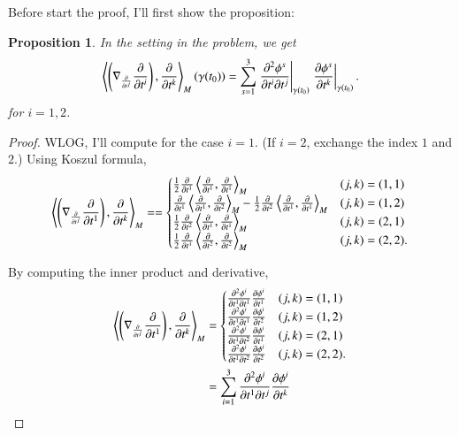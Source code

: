 \documentclass[a4paper, 12pt]{article}
\theoremstyle{Mydefinition}
\theoremstyle{Mytheorem}
\newtheorem{proposition}[statement]{Proposition}
\begin{document}
Before start the proof, I'll first show the proposition:
\begin{proposition}
In the setting in the problem, we get
\begin{equation*}
    \left\langle \left(\nabla_{\pdv{t^j}}\pdv{t^i}\right), \pdv{t^k}\right\rangle_M(\gamma(t_0))=\sum_{s=1}^3\left.\frac{\partial^2\phi^s}{\partial t^i\partial t^j}\right|_{\gamma(t_0)}\left.\frac{\partial\phi^s}{\partial t^k}\right|_{\gamma(t_0)}.
\end{equation*}
for $i=1,2$.
\end{proposition}
\begin{proof}
WLOG, I'll compute for the case $i=1$. (If $i=2$, exchange the index $1$ and $2$.) Using Koszul formula,
\begin{equation*}
    \left\langle \left(\nabla_{\pdv{t^j}}\pdv{t^1}\right), \pdv{t^k}\right\rangle_M==
    \begin{cases}
    \frac{1}{2}\pdv{t^1}\left\langle\pdv{t^1}, \pdv{t^1}\right\rangle_M & (j,k)=(1,1) \\
    \pdv{t^1}\left\langle\pdv{t^1}, \pdv{t^2}\right\rangle_M - \frac{1}{2}\pdv{t^2}\left\langle\pdv{t^1}, \pdv{t^1}\right\rangle_M & (j,k) = (1,2)\\
    \frac{1}{2}\pdv{t^2}\left\langle\pdv{t^1}, \pdv{t^1}\right\rangle_M & (j,k) = (2,1)\\
    \frac{1}{2}\pdv{t^1}\left\langle\pdv{t^2}, \pdv{t^2}\right\rangle_M & (j,k) = (2,2).
    \end{cases}
\end{equation*}

By computing the inner product and derivative,
\begin{equation*}
\begin{split}
    \left\langle \left(\nabla_{\pdv{t^j}}\pdv{t^1}\right), \pdv{t^k}\right\rangle_M&=
    \begin{cases}
    \frac{\partial^2\phi^i}{\partial t^1\partial t^1}\frac{\partial\phi^i}{\partial t^1} & (j,k)=(1,1) \\
    \frac{\partial^2\phi^i}{\partial t^1\partial t^1}\frac{\partial\phi^i}{\partial t^2} & (j,k) = (1,2)\\
    \frac{\partial^2\phi^i}{\partial t^1\partial t^2}\frac{\partial\phi^i}{\partial t^1} & (j,k) = (2,1)\\
    \frac{\partial^2\phi^i}{\partial t^1\partial t^2}\frac{\partial\phi^i}{\partial t^2} & (j,k)=(2,2).
    \end{cases}\\
    &= \sum_{i=1}^3 \frac{\partial^2\phi^i}{\partial t^1\partial t^j}\frac{\partial\phi^i}{\partial t^k}
\end{split}
\end{equation*}

\end{proof}
\end{document}
